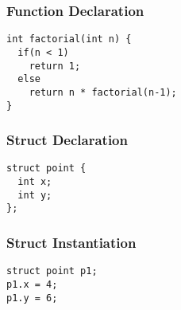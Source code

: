 \documentclass{article}
\begin{document}
\subsubsection{Function Declaration}

\begin{lstlisting}
int factorial(int n) {
  if(n < 1)
    return 1;
  else
    return n * factorial(n-1);
}
\end{lstlisting}

\subsubsection{Struct Declaration}

\begin{lstlisting}
struct point {
  int x;
  int y;
};
\end{lstlisting}

\subsubsection{Struct Instantiation}

\begin{lstlisting}
struct point p1;
p1.x = 4;
p1.y = 6;
\end{lstlisting}
\end{document}
